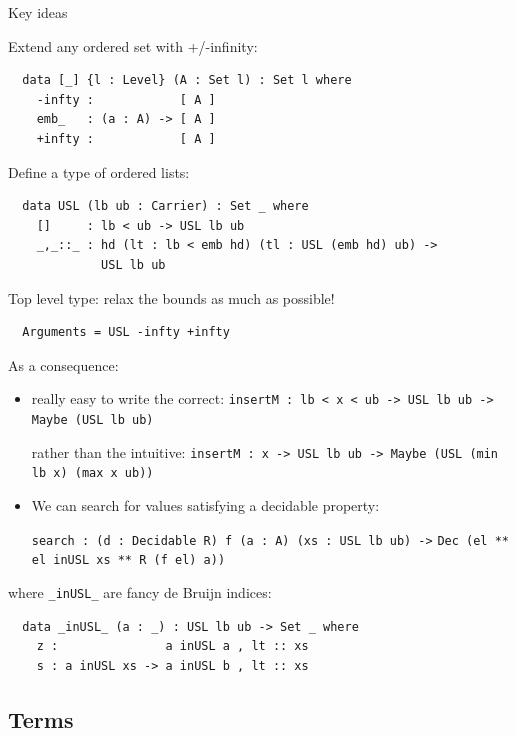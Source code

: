 \documentclass[dvipsnames]{beamer}
\begin{document}
\begin{frame}[fragile]{Key ideas}

  Extend any ordered set with +/-infinity:
  \begin{verbatim}
  data [_] {l : Level} (A : Set l) : Set l where
    -infty :            [ A ]
    emb_   : (a : A) -> [ A ]
    +infty :            [ A ]
  \end{verbatim}

  Define a type of ordered lists:
  \begin{verbatim}
  data USL (lb ub : Carrier) : Set _ where
    []     : lb < ub -> USL lb ub
    _,_::_ : hd (lt : lb < emb hd) (tl : USL (emb hd) ub) ->
             USL lb ub
  \end{verbatim}

  Top level type: relax the bounds as much as possible!
  \begin{verbatim}
  Arguments = USL -infty +infty
  \end{verbatim}
\end{frame}

\begin{frame}[fragile]{}
  As a consequence:

  \begin{itemize}
    \item really easy to write the correct:
      {\small\texttt{insertM : lb < x < ub -> USL lb ub -> Maybe (USL lb ub)}}

    rather than the intuitive:
      {\small \texttt{insertM : x -> USL lb ub -> Maybe (USL (min lb x) (max x ub))}}

    \item We can search for values satisfying a decidable property:

      \texttt{search : (d : Decidable R) f (a : A) (xs : USL lb ub) ->}
      \texttt{Dec (el ** el inUSL xs ** R (f el) a))}
  \end{itemize}

  where \texttt{_inUSL_} are fancy de Bruijn indices:
  \begin{verbatim}
  data _inUSL_ (a : _) : USL lb ub -> Set _ where
    z :               a inUSL a , lt :: xs
    s : a inUSL xs -> a inUSL b , lt :: xs
  \end{verbatim}
\end{frame}

\subsection{Terms}
\end{document}
